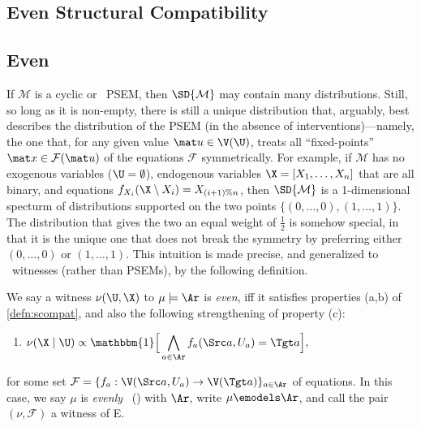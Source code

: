 \begin{subappendices}
{\section{Even Structural Compatibility}

\subsection{Even \SCibility}

If $\mathcal M$ is a cyclic or \subpartl\ PSEM, then $\SD{\mathcal M}$ may 
contain many distributions. Still, so long as it is non-empty, there is
still a unique distribution that, arguably, best describes the distribution of the PSEM (in the absence of interventions)---namely, the one that, for any given value $\mat u \in \V(\U)$, treats all ``fixed-points''
$\mat x \in \mathcal F(\mat u)$ of the equations $\mathcal F$ symmetrically.
\vfull{
\[
\Big(\text{ Recall that }\qquad
\mathcal F(\mat u) := \{\mat x \in \V(\X) : \forall a \in \Ar. f_a(\Src a(\mat x), u_a) = \Src a(\mat x) \}.
 \Big)
\]}
For example, if $\mathcal M$ has 
no exogenous variables ($\U = \emptyset$),
endogenous variables $\X = [X_1, \ldots, X_n]$ that are all binary, 
and equations 
$f_{X_i}(\X\setminus X_i) = X_{(i+1)\% n}$,
then $\SD{\mathcal M}$ is a 1-dimensional specturm of distributions
    supported on the two points $\{ (0, \ldots, 0), (1, \ldots, 1) \}$. 
The distribution that gives the two an equal weight of $\frac12$ is somehow special, in that it is the unique one that does not break the symmetry by preferring either $(0, \ldots, 0)$ or $(1, \ldots, 1)$. 
This intuition is made precise, and generalized to \scibility\ witnesses (rather than PSEMs), by the following definition.

\begin{defn}
        \label{defn:esim-compat}
    We say a witness $\nu(\U,\X)$ to $\mu \models \Ar$ is \emph{even}, iff
    it satisfies properties (a,b) of \cref{defn:scompat}, and also
    the following strengthening of property (c):
    \begin{enumerate}[start=4,label={(\alph*)}, nosep]
    \item $\displaystyle
        \nu(\X \mid \U) \propto \mathbbm{1}\Big[ \bigwedge_{a \in \Ar}
            f_a(\Src a, U_a) = \Tgt a \Big],
    $
    \end{enumerate}
    for some set
    $
    \mathcal F = 
    \{ f_a : \V(\Src a, U_a) \to \V(\Tgt a) \}_{a \in \Ar}
    $
     of equations.
     In this case, we say $\mu$ is \emph{evenly} \scible\ (\escible) with $\Ar$,
     write $\mu \emodels \Ar$, and 
    call the pair $(\nu, \mathcal F)$ a witness of E\scibility.
\end{defn}

}
\end{subappendices}
